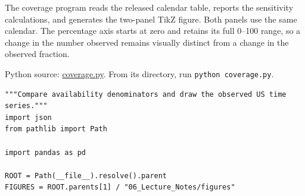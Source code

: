 \noindent The coverage program reads the released calendar table,
reports the sensitivity calculations, and generates the two-panel TikZ
figure. Both panels use the same calendar. The percentage axis starts at
zero and retains its full 0--100 range, so a change in the number
observed remains visually distinct from a change in the observed
fraction.

\FloatBarrier
{}
Python source:
\href{../03_Data_and_Code/McBroken/coverage.py}{coverage.py}. From its
directory, run \texttt{python\ coverage.py}.

\begin{Verbatim}[breaklines,breakanywhere,fontsize=\small]
"""Compare availability denominators and draw the observed US time series."""
import json
from pathlib import Path

import pandas as pd

ROOT = Path(__file__).resolve().parent
FIGURES = ROOT.parents[1] / "06_Lecture_Notes/figures"



\end{Verbatim}

